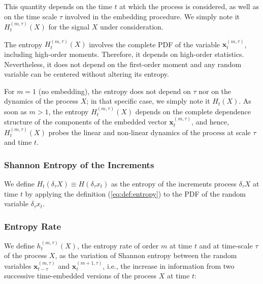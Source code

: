 \documentclass[aps,pra,groupedaddress,notitlepage]{revtex4-1}
\begin{document}
This quantity depends on the time $t$ at which the process is considered, as well as on the time scale $\tau$ involved in the embedding procedure. 
We simply note it $H_t^{(m,\tau)}(X)$ for the signal $X$ under consideration. 

The entropy $H_t^{(m,\tau)}(X)$ involves the complete PDF of the variable $\textbf{x}_t^{(m,\tau)}$, including high-order moments. Therefore, it depends on high-order statistics. Nevertheless, it does not depend on the first-order moment and any random variable can be centered without altering its entropy. 

For $m=1$ (no embedding), the entropy does not depend on $\tau$ nor on the dynamics of the process $X$; in that specific case, we simply note it $H_t(X)$. 
As soon as $m>1$, the entropy $H_t^{(m,\tau)}(X)$ depends on the complete dependence structure of the components of the embedded vector $\textbf{x}_t^{(m,\tau)}$, and hence, $H_t^{(m,\tau)}(X)$ probes the linear and non-linear dynamics of the process at scale $\tau$ and time $t$.


\subsubsection{Shannon Entropy of the Increments}

We define $H_t(\delta_\tau X) \equiv H(\delta_\tau x_t)$ as the entropy of the increments process $\delta_\tau X$ at time $t$ by applying the definition (\ref{eq:def:entropy}) to the PDF of the random variable $\delta_\tau x_t$.



\subsubsection{Entropy Rate}

We define $h_{t}^{(m,\tau)}(X)$, the entropy rate of order $m$ at time $t$ and at time-scale $\tau$ of the process $X$, as the variation of Shannon entropy between the random variables $\textbf{x}^{(m,\tau)}_{t-\tau}$ and $\textbf{x}^{(m+1,\tau)}_{t}$, {i.e.}, the increase in information from two successive time-embedded versions of the process $X$ at time $t$:
\vspace{-12pt}
\end{document}
